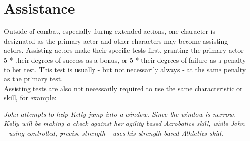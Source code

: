 \documentclass[12pt,a4paper,openany,dvipsnames]{book}
\begin{document}
	\section{Assistance}
	Outside of combat, especially during extended actions,
		one character is designated as the primary actor and other characters may become assisting actors.
	Assisting actors make their specific tests first,
		granting the primary actor 5 * their degrees of success as a bonus,
		or 5 * their degrees of failure as a penalty to her test.
	This test is usually - but not necessarily always - at the same penalty as the primary test.
	\\%
	Assisting tests are also not necessarily required to use the same characteristic or skill, for example:\par
	\begin{exampleblock}
		\itshape
		John attempts to help Kelly jump into a window. Since the window is narrow, Kelly will be making a check against her agility based Acrobatics skill, while John - using controlled, precise strength - uses his strength based Athletics skill.
	\end{exampleblock}
\end{document}

